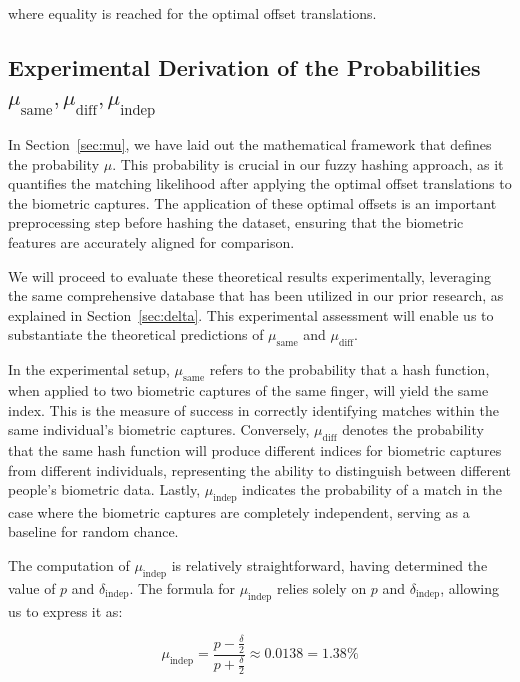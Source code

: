 where equality is reached for the optimal offset translations.

\subsection{Experimental Derivation of the Probabilities \(\mu_{\text{same}}, \mu_{\text{diff}}, \mu_{\text{indep}}\)}

In Section~\ref{sec:mu}, we have laid out the mathematical framework that defines the probability \(\mu\). This probability is crucial in our fuzzy hashing approach, as it quantifies the matching likelihood after applying the optimal offset translations to the biometric captures. The application of these optimal offsets is an important preprocessing step before hashing the dataset, ensuring that the biometric features are accurately aligned for comparison.

We will proceed to evaluate these theoretical results experimentally, leveraging the same comprehensive database that has been utilized in our prior research, as explained in Section~\ref{sec:delta}. This experimental assessment will enable us to substantiate the theoretical predictions of \(\mu_{\text{same}}\) and \(\mu_{\text{diff}}\).

In the experimental setup, \(\mu_{\text{same}}\) refers to the probability that a hash function, when applied to two biometric captures of the same finger, will yield the same index. This is the measure of success in correctly identifying matches within the same individual's biometric captures. Conversely, \(\mu_{\text{diff}}\) denotes the probability that the same hash function will produce different indices for biometric captures from different individuals, representing the ability to distinguish between different people's biometric data. Lastly, \(\mu_{\text{indep}}\) indicates the probability of a match in the case where the biometric captures are completely independent, serving as a baseline for random chance.

The computation of \( \mu_{\text{indep}} \) is relatively straightforward, having determined the value of \( p \) and \(\delta_{\text{indep}}\). The formula for \( \mu_{\text{indep}} \) relies solely on \( p \) and \(\delta_{\text{indep}}\), allowing us to express it as:

\[
    \mu_{\text{indep}} = \frac{p - \frac{\delta}{2}}{p + \frac{\delta}{2}} \approx 0.0138 = 1.38\%
\]

